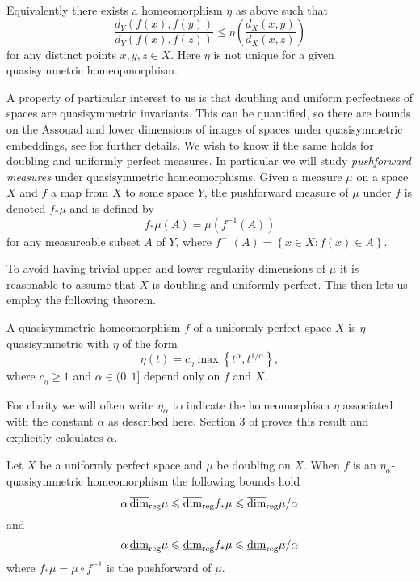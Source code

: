 Equivalently there exists a homeomorphism $\eta$ as above such that 
\[
\frac{d_Y(f(x),f(y))}{d_Y(f(x),f(z))} \le \eta \left(\frac{d_X(x,y)}{d_X(x,z)} \right)
\]
for any distinct points $x,y,z \in X$. Here $\eta$ is not unique for a given quasisymmetric homeopmorphism. 


A property of particular interest to us is that doubling and uniform perfectness of spaces are quasisymmetric invariants. This can be quantified, so there are bounds on the Assouad and lower dimensions of images of spaces under quasisymmetric embeddings, see \cite{heinonen} for further details. We wish to know if the same holds for doubling and uniformly perfect measures. In particular we will study \textit{pushforward measures} under quasisymmetric homeomorphisms. Given a measure $\mu$ on a space $X$ and $f$ a map from $X$ to some space $Y$, the pushforward measure of $\mu$ under $f$ is denoted $f_*\mu$ and is defined by
\[
f_*\mu (A) = \mu(f^{-1}(A))
\]
for any measureable subset $A$ of $Y$, where $f^{-1}(A) = \left\{x \in X \colon f(x) \in A \right\}$. 

To avoid having trivial upper and lower regularity dimensions of $\mu$ it is reasonable to assume that $X$ is doubling and uniformly perfect. This then lets us employ the following theorem. 

\begin{thm}
	A quasisymmetric homeomorphism $f$ of a uniformly perfect space $X$ is $\eta$-quasisymmetric with $\eta$ of the form
	\[
	\eta(t) = c_\eta \max\left\{t^\alpha, t^{1/\alpha}\right\},
	\]
	where $c_\eta \ge 1 $ and $\alpha \in (0,1]$ depend only on $f$ and $X$.
\end{thm}

For clarity we will often write $\eta_{\alpha}$ to indicate the homeomorphism $\eta$ associated with the constant $\alpha$ as described here. Section 3 of \cite{tukia-vaisala} proves this result and explicitly calculates $\alpha$. 

\begin{thm}
	Let $X$ be a uniformly perfect space and $\mu$ be doubling on $X$. When $f$ is an $\eta_\alpha$-quasisymmetric homeomorphism the following bounds hold
	\[
	\alpha \, \overline{\dim}_{\textup{reg}} \mu \leqslant \overline{\dim}_{\textup{reg}} f_{*}\mu \leqslant \overline{\dim}_{\textup{reg}} \mu/\alpha
	\]
	and 
	\[
	\alpha \, \underline{\dim}_{\textup{reg}} \mu \leqslant \underline{\dim}_{\textup{reg}} f_{*}\mu \leqslant \underline{\dim}_{\textup{reg}} \mu/\alpha
	\]
	where $f_{*}\mu = \mu \circ f^{-1}$ is the pushforward of $\mu$.
\end{thm}




